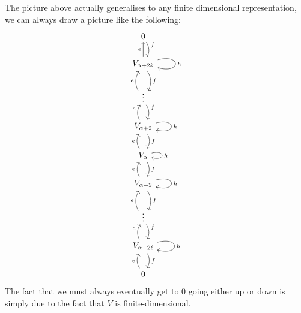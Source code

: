 \documentclass[fleqn]{NotesClass}
\begin{document}
    The picture above actually generalises to any finite dimensional representation, we can always draw a picture like the following:
    \begin{equation}
        \begin{tikzcd}
            0 \arrow[d, bend left, "f"]\\
            V_{\alpha + 2k} \arrow[u, "e"] \arrow[loop right, "h"] \arrow[d, bend left, "f"]\\
            \vdots \arrow[d, bend left, "f"] \arrow[u, bend left, "e"]\\
            V_{\alpha + 2} \arrow[loop right, "h"] \arrow[d, bend left, "f"] \arrow[u, "e", bend left]\\
            V_{\alpha} \arrow[loop right, "h"] \arrow[u, bend left, "e"] \arrow[d, bend left, "f"]\\
            V_{\alpha - 2} \arrow[loop right, "h"] \arrow[u, bend left, "e"] \arrow[d, bend left, "f"]\\
            \vdots \arrow[d, bend left, "f"] \arrow[u, bend left, "e"]\\
            V_{\alpha - 2\ell} \arrow[loop right, "h"] \arrow[d, bend left, "f"] \arrow[u, "e", bend left]\\
            0 \arrow[u, bend left, "e"]
        \end{tikzcd}
    \end{equation}
    The fact that we must always eventually get to \(0\) going either up or down is simply due to the fact that \(V\) is finite-dimensional.
    
\end{document}
